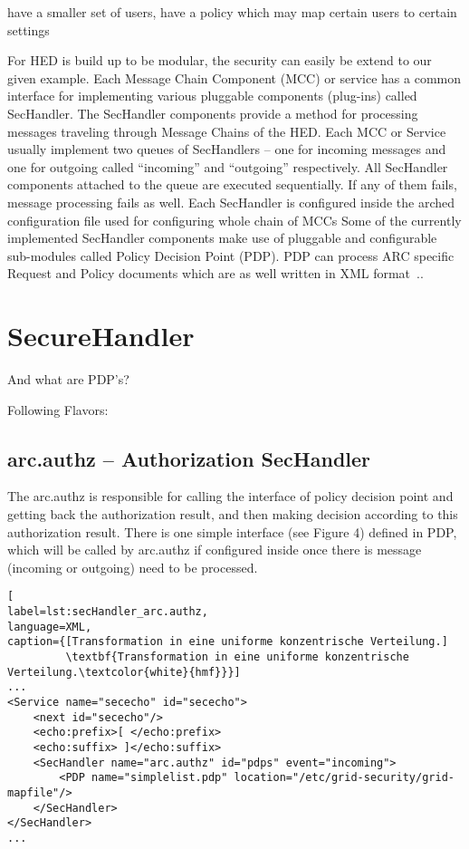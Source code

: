 have a smaller set of users,
have a policy which may map certain users to certain settings



For HED is build up to  %
be modular, the security can easily be extend to our given example.
Each Message Chain Component (MCC) or service has a common interface for implementing various pluggable components (plug-ins) called SecHandler. The SecHandler components provide a method for processing messages traveling through Message Chains of the HED. 
Each MCC or Service usually implement two queues of SecHandlers – one for incoming messages and one for outgoing called “incoming” and “outgoing” respectively. All SecHandler components attached to the queue are executed sequentially. 
If any of them fails, message processing fails as well. 
Each SecHandler is configured inside the arched configuration file used for configuring whole chain of MCCs 
Some of the currently implemented SecHandler components make use of pluggable and configurable sub-modules called Policy Decision Point (PDP). PDP can process ARC specific Request and Policy documents which are as well written in XML format~\cite{QIANG_2008}..





\section{SecureHandler}
And what are PDP's?



Following Flavors:
\subsection{arc.authz – Authorization SecHandler}
The arc.authz is responsible for calling the interface of policy decision point and getting back the
authorization result, and then making decision according to this authorization result. There is one simple
interface (see Figure 4) defined in PDP, which will be called by arc.authz if configured inside once there
is message (incoming or outgoing) need to be processed.

\begin{minipage}[t]{\textwidth}
\begin{lstlisting}[
label=lst:secHandler_arc.authz,
language=XML,
caption={[Transformation in eine uniforme konzentrische Verteilung.]
         \textbf{Transformation in eine uniforme konzentrische Verteilung.\textcolor{white}{hmf}}}]
...
<Service name="sececho" id="sececho">
	<next id="sececho"/>
	<echo:prefix>[ </echo:prefix>
	<echo:suffix> ]</echo:suffix>
	<SecHandler name="arc.authz" id="pdps" event="incoming">
		<PDP name="simplelist.pdp" location="/etc/grid-security/grid-mapfile"/>
	</SecHandler>
</SecHandler>
...
\end{lstlisting}
\end{minipage}

